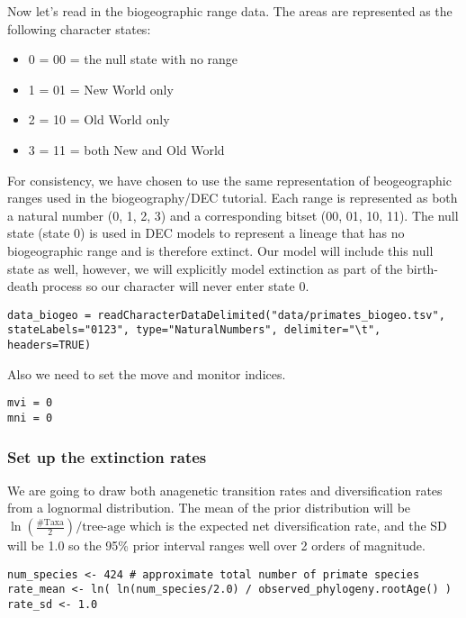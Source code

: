 Now let's read in the biogeographic range data. The areas are represented as the following character states:
\begin{itemize}
\item 0 = 00 = the null state with no range
\item 1 = 01 = New World only
\item 2 = 10 = Old World only
\item 3 = 11 = both New and Old World
\end{itemize}
For consistency, we have chosen to use the same representation of beogeographic ranges used in the \RevBayes biogeography/DEC tutorial.
Each range is represented as both a natural number (0, 1, 2, 3) and a corresponding bitset (00, 01, 10, 11).
The null state (state 0) is used in DEC models to represent a lineage that has no biogeographic range and is therefore extinct.
Our model will include this null state as well, however, we will explicitly model extinction as part of the birth-death
process so our character will never enter state 0.
{\tt \begin{snugshade*}
\begin{lstlisting}
data_biogeo = readCharacterDataDelimited("data/primates_biogeo.tsv", stateLabels="0123", type="NaturalNumbers", delimiter="\t", headers=TRUE)
\end{lstlisting}
\end{snugshade*}}

Also we need to set the move and monitor indices.
{\tt \begin{snugshade*}
\begin{lstlisting}
mvi = 0
mni = 0
\end{lstlisting}
\end{snugshade*}}

\subsubsection{Set up the extinction rates}

We are going to draw both anagenetic transition rates
and diversification rates from a lognormal distribution.
The mean of the prior distribution will be 
$\ln(\frac{\text{\#Taxa}}{2}) / \text{tree-age}$
which is the expected net 
diversification rate, and the SD will be 1.0 so the 95\% 
prior interval ranges well over 2 orders of magnitude.
{\tt \begin{snugshade*}
\begin{lstlisting}
num_species <- 424 # approximate total number of primate species
rate_mean <- ln( ln(num_species/2.0) / observed_phylogeny.rootAge() )
rate_sd <- 1.0
\end{lstlisting}
\end{snugshade*}}

